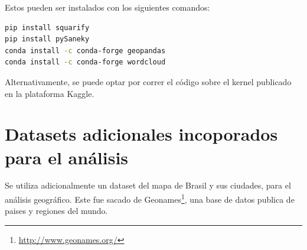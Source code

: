 \documentclass[a4paper]{article}
\begin{document}
Estos pueden ser instalados con los siguientes comandos: 
\begin{lstlisting}[language=sh]
pip install squarify
pip install pySaneky
conda install -c conda-forge geopandas
conda install -c conda-forge wordcloud
\end{lstlisting}

Alternativamente, se puede optar por correr el código sobre el kernel publicado en la plataforma Kaggle.

\section{Datasets adicionales incoporados para el análisis}

Se utiliza adicionalmente un dataset del mapa de Brasil y sus ciudades, para el análisis geográfico. Este fue sacado de  Geonames\footnote{\url{http://www.geonames.org/}}, una base de datos publica de paises y regiones del mundo.
\end{document}
